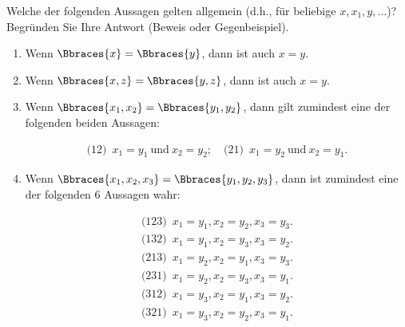 
\begin{exercise}[1]

Welche der folgenden Aussagen gelten allgemein (d.h., für beliebige $x, x_1, y, \ldots$)?
Begründen Sie Ihre Antwort (Beweis oder Gegenbeispiel).

\begin{enumerate}[label = \alph*.]

    \item Wenn $\Bbraces{x} = \Bbraces{y}$, dann ist auch $x = y$.

    \item Wenn $\Bbraces{x, z} = \Bbraces{y, z}$, dann ist auch $x = y$.

    \item Wenn $\Bbraces{x_1, x_2} = \Bbraces{y_1, y_2}$, dann gilt zumindest eine der folgenden beiden Aussagen:
    
    \begin{align*}
        \text{(12)} \enspace
        x_1 = y_1 ~\text{und}~ x_2 = y_2;
        \quad
        \text{(21)} \enspace
        x_1 = y_2 ~\text{und}~ x_2 = y_1.
    \end{align*}

    \item Wenn $\Bbraces{x_1, x_2, x_3} = \Bbraces{y_1, y_2, y_3}$, dann ist zumindest eine der folgenden 6 Aussagen wahr:
    
    \begin{align*}
        \text{(123)} \enspace
        x_1 = y_1, x_2 = y_2, x_3 = y_3. \\
        \text{(132)} \enspace
        x_1 = y_1, x_2 = y_3, x_3 = y_2. \\
        \text{(213)} \enspace
        x_1 = y_2, x_2 = y_1, x_3 = y_3. \\
        \text{(231)} \enspace
        x_1 = y_2, x_2 = y_3, x_3 = y_1. \\
        \text{(312)} \enspace
        x_1 = y_3, x_2 = y_1, x_3 = y_2. \\
        \text{(321)} \enspace
        x_1 = y_3, x_2 = y_2, x_3 = y_1.
    \end{align*}
\end{enumerate}

\end{exercise}


